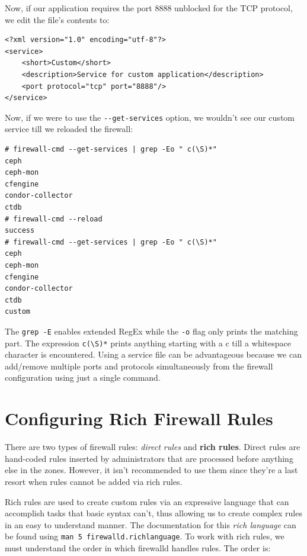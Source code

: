 \noindent
Now, if our application requires the port 8888 unblocked for the TCP protocol, we edit the file's contents to:

\vspace{-15pt}
\begin{verbatim}
<?xml version="1.0" encoding="utf-8"?>
<service>
	<short>Custom</short>
	<description>Service for custom application</description>
	<port protocol="tcp" port="8888"/>
</service>
\end{verbatim}
\vspace{-10pt}	

\noindent
Now, if we were to use the \verb|--get-services| option, we wouldn't see our custom service till we reloaded the firewall:

\vspace{-15pt}
\begin{verbatim}
# firewall-cmd --get-services | grep -Eo " c(\S)*"
ceph
ceph-mon
cfengine
condor-collector
ctdb
# firewall-cmd --reload
success
# firewall-cmd --get-services | grep -Eo " c(\S)*"
ceph
ceph-mon
cfengine
condor-collector
ctdb
custom
\end{verbatim}
\vspace{-10pt}	

\noindent
The \verb|grep -E| enables extended RegEx while the \verb|-o| flag only prints the matching part. The expression \verb|c(\S)*| prints anything starting with a c till a whitespace character is encountered. Using a service file can be advantageous because we can add/remove multiple ports and protocols simultaneously from the firewall configuration using just a single command. 

	\section{Configuring Rich Firewall Rules}
There are two types of firewall rules: \textit{direct rules} and \textbf{rich rules}. Direct rules are hand-coded rules inserted by administrators that are processed before anything else in the zones. However, it isn't recommended to use them since they're a last resort when rules cannot be added via rich rules. 

Rich rules are used to create custom rules via an expressive language that can accomplish tasks that basic syntax can't, thus allowing us to create complex rules in an easy to understand manner. The documentation for this \textit{rich language} can be found using \verb|man 5 firewalld.richlanguage|. To work with rich rules, we must understand the order in which firewalld handles rules. The order is:

